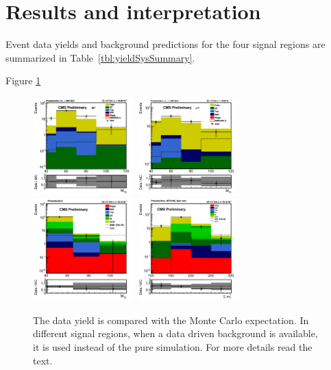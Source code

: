 \section{Results and interpretation}
\label{sect:stat}
Event data yields and background predictions for the four signal regions are summarized in Table~\ref{tbl:yieldSysSummary}.

Figure \ref{fig:yield_final}
\begin{figure}[!Hhtb]
\centering
\includegraphics[width=0.35\textwidth,keepaspectratio=true]{StatisticsFig/MT2_tauMTgt200_DDFakeEleTau.png}
\includegraphics[width=0.35\textwidth,keepaspectratio=true]{StatisticsFig/MT2muTau_tauMTgt200_DDFake.png}
\includegraphics[width=0.35\textwidth,keepaspectratio=true]{StatisticsFig/QCDWestimation_plot.png}
\includegraphics[width=0.35\textwidth,keepaspectratio=true]{StatisticsFig/QCDestimation_plot.png}
\caption{The data yield is compared with the Monte Carlo expectation. In different signal regions, 
when a data driven background is available, it is used instead of the pure simulation. For more details read the text.}
\label{fig:yield_final}
\end{figure}
